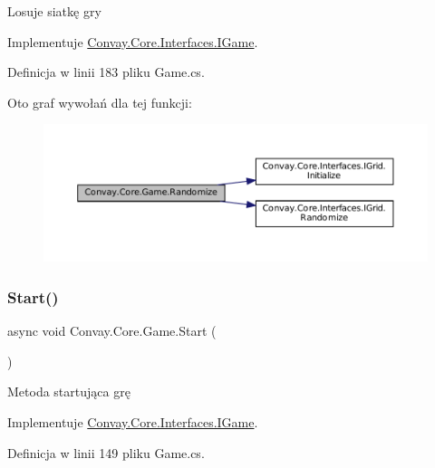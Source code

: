 Losuje siatkę gry 



Implementuje \hyperlink{interface_convay_1_1_core_1_1_interfaces_1_1_i_game_a782f64a6dd964db6c27752dd9962c1c1}{Convay.\+Core.\+Interfaces.\+I\+Game}.



Definicja w linii 183 pliku Game.\+cs.

Oto graf wywołań dla tej funkcji\+:
\nopagebreak
\begin{figure}[H]
\begin{center}
\leavevmode
\includegraphics[width=350pt]{class_convay_1_1_core_1_1_game_a59b58207976ef30b82932d1196806c8f_cgraph}
\end{center}
\end{figure}
\hypertarget{class_convay_1_1_core_1_1_game_a34947ec8157eabc9eba8d5d8fd116f42}{}\label{class_convay_1_1_core_1_1_game_a34947ec8157eabc9eba8d5d8fd116f42} 
\subsubsection{\texorpdfstring{Start()}{Start()}}
{\footnotesize\ttfamily async void Convay.\+Core.\+Game.\+Start (\begin{DoxyParamCaption}{ }\end{DoxyParamCaption})}



Metoda startująca grę 



Implementuje \hyperlink{interface_convay_1_1_core_1_1_interfaces_1_1_i_game_a76cff5d7173fd5c3b7f7959b0e7baa1b}{Convay.\+Core.\+Interfaces.\+I\+Game}.



Definicja w linii 149 pliku Game.\+cs.

